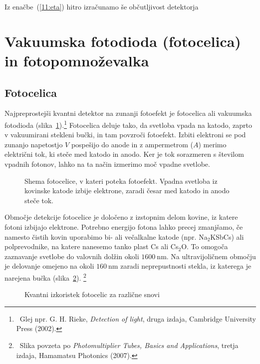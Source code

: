 Iz enačbe~(\ref{11:eta}) hitro izračunamo še občutljivost detektorja 

\section{Vakuumska fotodioda (fotocelica) in fotopomnoževalka}
\subsection*{Fotocelica}
Najpreprostejši kvantni detektor na zunanji fotoefekt je fotocelica ali vakuumska fotodioda
(slika~\ref{fig:Fotoefekt}).\footnote{~Glej npr. G. H. Rieke, {\it Detection 
of light}, druga izdaja, Cambridge University Press (2002).} 
Fotocelica deluje tako, da svetloba vpada na katodo, 
zaprto v vakuumirani stekleni bučki, in tam povzroči fotoefekt. Izbiti elektroni 
se pod zunanjo napetostjo $V$ pospešijo do anode in z ampermetrom ($A$) 
merimo električni tok, ki steče med katodo in anodo. 
Ker je tok sorazmeren s številom vpadnih fotonov, lahko na ta 
način izmerimo moč vpadne svetlobe.

\begin{figure}[ht]
\centering
\def\svgwidth{60truemm} 

\caption{Shema fotocelice, v kateri poteka fotoefekt. 
Vpadna svetloba iz kovinske katode izbije elektrone, zaradi česar med katodo 
in anodo steče tok.}
\label{fig:Fotoefekt}
\end{figure}

Območje detekcije fotocelice je določeno z izstopnim delom kovine, iz 
katere fotoni izbijajo elektrone. Potrebno energijo fotona lahko precej zmanjšamo, 
če namesto čistih kovin uporabimo bi- ali večalkalne katode 
(npr. Na$_2$KSbCs) ali polprevodnike, na katere nanesemo tanko plast 
Cs ali Cs$_2$O. To omogoča zaznavanje svetlobe do valovnih dolžin okoli $1600~\si{\nano\metre}$. 
Na ultravijoličnem območju je delovanje
omejeno na okoli $160~\si{\nano\metre}$ zaradi neprepustnosti stekla, 
iz katerega je narejena bučka 
(slika~\ref{fig:Fotodioda}).
\footnote{~Slika povzeta po {\it Photomultiplier Tubes, Basics and Applications}, tretja izdaja, Hamamatsu
Photonics (2007).}
\begin{figure}[ht]
\centering
\def\svgwidth{130truemm} 

\caption{Kvantni izkoristek fotocelic za različne snovi}
\label{fig:Fotodioda}
\end{figure}

